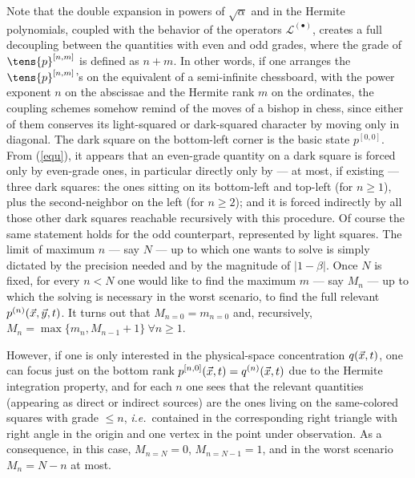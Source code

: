 Note that the double expansion in powers of $\sqrt{\alpha}$ and in the Hermite polynomials,
coupled with the behavior of the operators $\mathcal{L}^{(\bullet)}$,
creates a full decoupling between the quantities with even and odd grades,
where the grade of $\tens{p}^{[n,m]}$ is defined as $n+m$.
In other words, if one arranges the $\tens{p}^{[n,m]}$'s on the equivalent of a semi-infinite chessboard,
with the power exponent $n$ on the abscissae and the Hermite rank $m$ on the ordinates,
the coupling schemes somehow remind of the moves of a bishop in chess,
since either of them conserves its light-squared or dark-squared character by moving only in diagonal.
The dark square on the bottom-left corner is the basic state $p^{[0,0]}$.
From (\ref{equ}), it appears that an even-grade quantity on a dark square is forced only by even-grade ones,
in particular directly only by --- at most, if existing --- three dark squares:
the ones sitting on its bottom-left and top-left (for $n\ge1$), plus the second-neighbor on the left (for $n\ge2$);
and it is forced indirectly by all those other dark squares reachable recursively with this procedure.
Of course the same statement holds for the odd counterpart, represented by light squares.
The limit of maximum $n$ --- say $N$ --- up to which one wants to solve
is simply dictated by the precision needed and by the magnitude of $|1-\beta|$.
Once $N$ is fixed, for every $n<N$ one would like to find the maximum $m$ --- say $M_n$ ---
up to which the solving is necessary in the worst scenario, to find the full relevant $p^{(n)}(\vec{x},\vec{y},t)$. 
It turns out that $M_{n=0}=m_{n=0}$ and, recursively, $M_n=\max\{m_n,M_{n-1}+1\}\ \forall n\ge1$.

However, if one is only interested in the physical-space concentration $q(\vec{x},t)$,
one can focus just on the bottom rank $p^{[n,0]}(\vec{x},t)=q^{(n)}(\vec{x},t)$ due to the Hermite integration property,
and for each $n$ one sees that the relevant quantities (appearing as direct or indirect sources)
are the ones living on the same-colored squares with grade $\le n$,
\emph{i.e.}\ contained in the corresponding right triangle with right angle
in the origin and one vertex in the point under observation.
As a consequence, in this case, $M_{n=N}=0$, $M_{n=N-1}=1$, and in the worst scenario $M_n=N-n$ at most.
%
